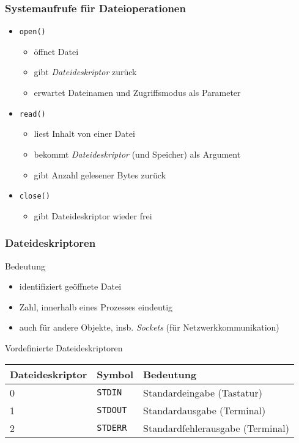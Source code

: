 \begin{frame}
  \frametitle{Systemaufrufe für Dateioperationen}

  \begin{itemize}
    \item \texttt{open()} 
      \begin{itemize}
        \item öffnet Datei
        \item gibt \emph{Dateideskriptor} zurück
        \item erwartet Dateinamen und Zugriffsmodus als Parameter
      \end{itemize}

    \item \texttt{read()}
      \begin{itemize}
        \item liest Inhalt von einer Datei
        \item bekommt \emph{Dateideskriptor} (und Speicher) als Argument
        \item gibt Anzahl gelesener Bytes zurück
      \end{itemize}

    \item \texttt{close()}
      \begin{itemize}
        \item gibt Dateideskriptor wieder frei
      \end{itemize}

  \end{itemize}
\end{frame}

\begin{frame}
  \frametitle{Dateideskriptoren}

  \begin{block}{Bedeutung}
    \begin{itemize}
      \item identifiziert geöffnete Datei
      \item Zahl, innerhalb eines Prozesses eindeutig
      \item auch für andere Objekte, insb. \emph{Sockets} (für Netzwerkkommunikation)
    \end{itemize}
  \end{block}

  \begin{block}{Vordefinierte Dateideskriptoren}
    \centering
    \medskip
    \begin{tabular}{|lll|}
      \hline
      \textbf{Dateideskriptor} & \textbf{Symbol} & \textbf{Bedeutung} \\
      \hline
        0      & \texttt{STDIN}    & Standardeingabe (Tastatur) \\
        1      & \texttt{STDOUT}   & Standardausgabe (Terminal) \\
        2      & \texttt{STDERR}   & Standardfehlerausgabe (Terminal) \\
      \hline
    \end{tabular}
    \medskip
  \end{block}
\end{frame}

